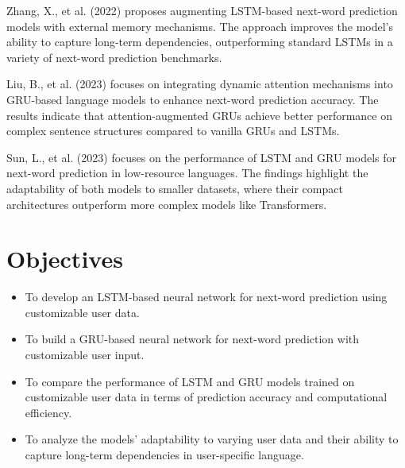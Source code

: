\documentclass[conference]{IEEEtran}
\begin{document}
Zhang, X., et al. (2022) proposes augmenting LSTM-based next-word prediction models with external memory mechanisms. The approach improves the model's ability to capture long-term dependencies, outperforming standard LSTMs in a variety of next-word prediction benchmarks.

Liu, B., et al. (2023) focuses on integrating dynamic attention mechanisms into GRU-based language models to enhance next-word prediction accuracy. The results indicate that attention-augmented GRUs achieve better performance on complex sentence structures compared to vanilla GRUs and LSTMs.

Sun, L., et al. (2023) focuses on the performance of LSTM and GRU models for next-word prediction in low-resource languages. The findings highlight the adaptability of both models to smaller datasets, where their compact architectures outperform more complex models like Transformers.


\section*{Objectives}
\begin{itemize}
    \item To develop an LSTM-based neural network for next-word prediction using customizable user data.
    \item To build a GRU-based neural network for next-word prediction with customizable user input.
    \item To compare the performance of LSTM and GRU models trained on customizable user data in terms of prediction accuracy and computational efficiency.
    \item To analyze the models' adaptability to varying user data and their ability to capture long-term dependencies in user-specific language.
\end{itemize}
\end{document}
